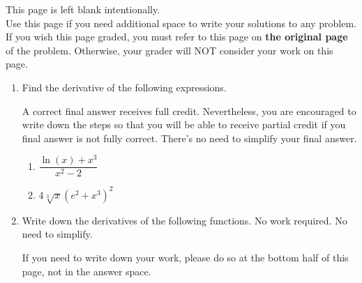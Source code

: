 \documentclass[11pt]{article}
\begin{document}
\vfill


\newpage

This page is left blank intentionally.\\

Use this page if you need additional space to write your solutions to any problem. \\

If you wish this page graded, you must refer to this page on \textbf{the original page} of the problem. Otherwise, your grader will NOT consider your work on this page.

\newpage%


\begin{enumerate}




\item Find the derivative of the following expressions. 

A correct final answer receives full credit. Nevertheless, you are encouraged to write down the steps so that you will be able to receive partial credit if you final answer is not fully correct. There's no need to simplify your final answer.

\begin{enumerate}
\item $\dfrac{\ln(x)+x^3}{x^2-2}$

\vfill

\item $4\sqrt[3]{x}\left(e^2+x^3\right)^2$

\vfill 
\end{enumerate}


\newpage

\item Write down the derivatives of the following functions. No work required. No need to simplify.

If you need to write down your work, please do so at the bottom half of this page, not in the answer space.


\end{enumerate}
\end{document}
